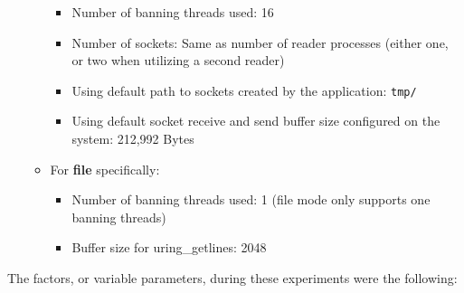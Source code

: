 \begin{itemize}
\begin{itemize}
\begin{itemize}
            \item Number of banning threads used\@: 16
            \item Number of sockets\@: Same as number of reader processes (either one, or two when utilizing a second reader)
            \item Using default path to sockets created by the application\@: \texttt{tmp/}
            \item Using default socket receive and send buffer size configured on the system\@: 212,992 Bytes
        \end{itemize}
        \item For \textbf{file} specifically\@:
        \begin{itemize}
            \item Number of banning threads used\@: 1 (file mode only supports one banning threads)
            \item Buffer size for uring\_getlines\@: 2048
        \end{itemize}
    \end{itemize}
\end{itemize}

\bigskip
\noindent
The factors, or variable parameters, during these experiments were the following\@:

